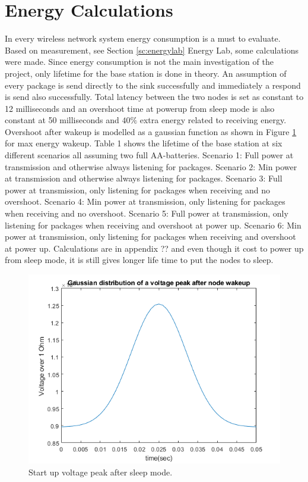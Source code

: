 \section{Energy Calculations}\label{sc:energyCalculations}
In every wireless network system energy consumption is a must to evaluate. Based on measurement, see Section \ref{sc:energylab} Energy Lab, some calculations were made. Since energy consumption is not the main investigation of the project, only lifetime for the base station is done in theory. An assumption of every package is send directly to the sink successfully and immediately a respond is send also successfully. Total latency between the two nodes is set as constant to 12 milliseconds and an overshoot time at powerup from sleep mode is also constant at 50 milliseconds and $40\%$ extra energy related to receiving energy. Overshoot after wakeup is modelled as a gaussian function as shown in Figure \ref{fig:gaussianDistributionsOfVoltagePeak} for max energy wakeup. Table 1 shows the lifetime of the base station at six different scenarios all assuming two full AA-batteries.%
Scenario 1: Full power at transmission and otherwise always listening for packages.
Scenario 2: Min power at transmission and otherwise always listening for packages.
Scenario 3: Full power at transmission, only listening for packages when receiving and no overshoot.
Scenario 4: Min power at transmission, only listening for packages when receiving and no overshoot.
Scenario 5: Full power at transmission, only listening for packages when receiving and overshoot at power up.
Scenario 6: Min power at transmission, only listening for packages when receiving and overshoot at power up.
Calculations are in appendix ?? and even though it cost to power up from sleep mode, it is still gives longer life time to put the nodes to sleep.

\begin{figure}[H]
	\centering
	\includegraphics[width=\linewidth]{theory/energyCalculations/fig/gaussianDistributionsOfVoltagePeak.png}
	\caption{Start up voltage peak after sleep mode.}
	\label{fig:gaussianDistributionsOfVoltagePeak}
\end{figure}
